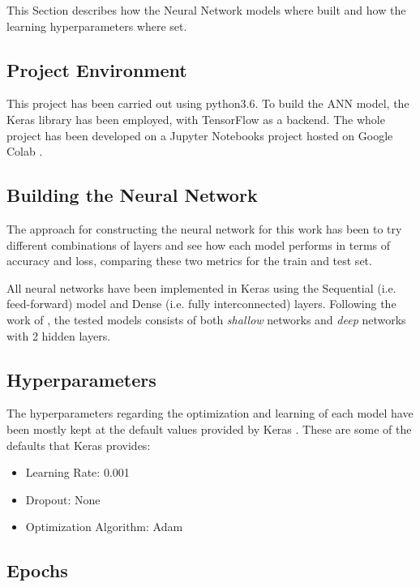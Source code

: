 This Section describes how the Neural Network models where built and how the learning hyperparameters where set.

\subsection{Project Environment}

This project has been carried out using python3.6. To build the ANN model, the Keras library has been employed, with TensorFlow as a backend. The whole project has been developed on a Jupyter Notebooks project hosted on Google Colab \cite{project}. 

\subsection{Building the Neural Network}

The approach for constructing the neural network for this work has been to try different combinations of layers and see how each model performs in terms of accuracy and loss, comparing these two metrics for the train and test set.

All neural networks have been implemented in Keras \cite{kerass} using the Sequential (i.e. feed-forward) model and Dense (i.e. fully interconnected) layers. Following the work of \cite{deepshallow}, the tested models consists of both \textit{shallow} networks and \textit{deep} networks with 2 hidden layers.


\subsection{Hyperparameters}

The hyperparameters regarding the optimization and learning of each model have been mostly kept at the default values provided by Keras \cite{keras}. These are some of the defaults that Keras provides:

\begin{itemize}
    \item Learning Rate: 0.001
    \item Dropout: None
    \item Optimization Algorithm: Adam
\end{itemize}

\subsection{Epochs}

